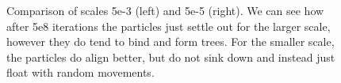 \begin{figure}
  \begin{minipage}[t]{0.45\textwidth}
  \end{minipage}
  \hfill
  \begin{minipage}[t]{0.45\textwidth}
  \end{minipage}
  \caption{Comparison of scales 5e-3 (left) and 5e-5 (right). We can see how after 5e8 iterations the particles just settle out for the larger scale, however they do tend to bind and form trees. For the smaller scale, the particles do align better, but do not sink down and instead just float with random movements.}
  \label{fig:sca_comp1}
\end{figure}
